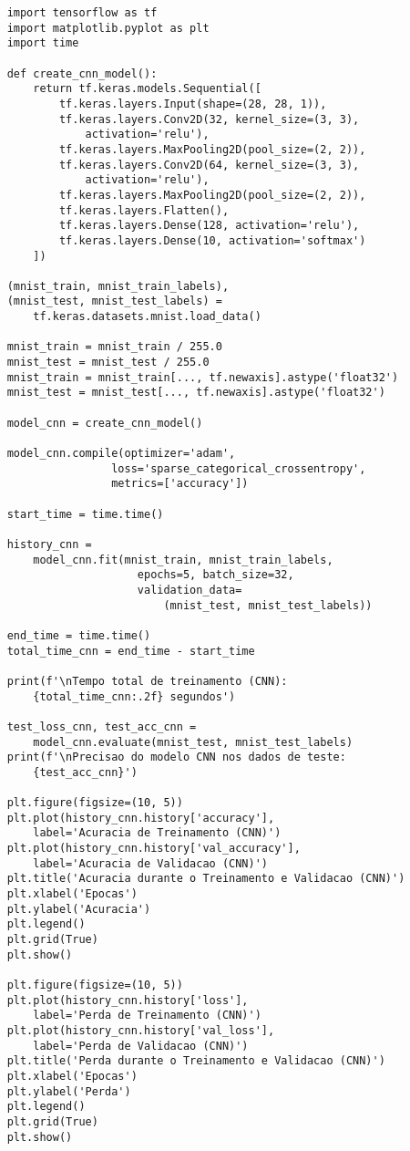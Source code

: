 \begin{lstlisting}
    import tensorflow as tf
    import matplotlib.pyplot as plt
    import time

    def create_cnn_model():
        return tf.keras.models.Sequential([
            tf.keras.layers.Input(shape=(28, 28, 1)),
            tf.keras.layers.Conv2D(32, kernel_size=(3, 3), 
                activation='relu'),
            tf.keras.layers.MaxPooling2D(pool_size=(2, 2)),
            tf.keras.layers.Conv2D(64, kernel_size=(3, 3), 
                activation='relu'),
            tf.keras.layers.MaxPooling2D(pool_size=(2, 2)),
            tf.keras.layers.Flatten(),
            tf.keras.layers.Dense(128, activation='relu'),
            tf.keras.layers.Dense(10, activation='softmax')
        ])

    (mnist_train, mnist_train_labels), 
    (mnist_test, mnist_test_labels) = 
        tf.keras.datasets.mnist.load_data()
    
    mnist_train = mnist_train / 255.0
    mnist_test = mnist_test / 255.0
    mnist_train = mnist_train[..., tf.newaxis].astype('float32')
    mnist_test = mnist_test[..., tf.newaxis].astype('float32')

    model_cnn = create_cnn_model()

    model_cnn.compile(optimizer='adam',
                    loss='sparse_categorical_crossentropy',
                    metrics=['accuracy'])

    start_time = time.time()

    history_cnn = 
        model_cnn.fit(mnist_train, mnist_train_labels,
                        epochs=5, batch_size=32,
                        validation_data=
                            (mnist_test, mnist_test_labels))

    end_time = time.time()
    total_time_cnn = end_time - start_time
    
    print(f'\nTempo total de treinamento (CNN): 
        {total_time_cnn:.2f} segundos')

    test_loss_cnn, test_acc_cnn = 
        model_cnn.evaluate(mnist_test, mnist_test_labels)
    print(f'\nPrecisao do modelo CNN nos dados de teste: 
        {test_acc_cnn}')

    plt.figure(figsize=(10, 5))
    plt.plot(history_cnn.history['accuracy'], 
        label='Acuracia de Treinamento (CNN)')
    plt.plot(history_cnn.history['val_accuracy'], 
        label='Acuracia de Validacao (CNN)')
    plt.title('Acuracia durante o Treinamento e Validacao (CNN)')
    plt.xlabel('Epocas')
    plt.ylabel('Acuracia')
    plt.legend()
    plt.grid(True)
    plt.show()

    plt.figure(figsize=(10, 5))
    plt.plot(history_cnn.history['loss'], 
        label='Perda de Treinamento (CNN)')
    plt.plot(history_cnn.history['val_loss'], 
        label='Perda de Validacao (CNN)')
    plt.title('Perda durante o Treinamento e Validacao (CNN)')
    plt.xlabel('Epocas')
    plt.ylabel('Perda')
    plt.legend()
    plt.grid(True)
    plt.show()
\end{lstlisting}

